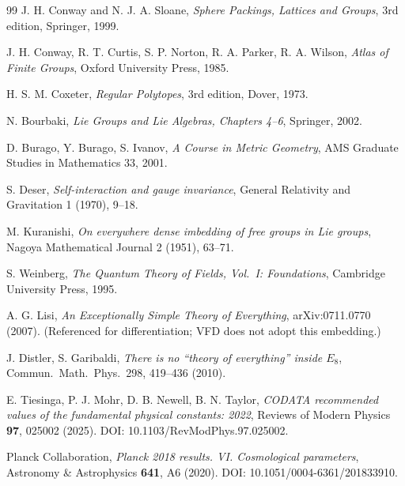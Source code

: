 \documentclass[12pt]{article}
\theoremstyle{definition}
\theoremstyle{remark}
\begin{document}
\begin{thebibliography}{99}
 J. H. Conway and N. J. A. Sloane, \emph{Sphere Packings, Lattices and Groups}, 3rd edition, Springer, 1999.

 J. H. Conway, R. T. Curtis, S. P. Norton, R. A. Parker, R. A. Wilson, \emph{Atlas of Finite Groups}, Oxford University Press, 1985.

 H. S. M. Coxeter, \emph{Regular Polytopes}, 3rd edition, Dover, 1973.

 N. Bourbaki, \emph{Lie Groups and Lie Algebras, Chapters 4--6}, Springer, 2002.

 D. Burago, Y. Burago, S. Ivanov, \emph{A Course in Metric Geometry}, AMS Graduate Studies in Mathematics 33, 2001.

 S. Deser, \emph{Self-interaction and gauge invariance}, General Relativity and Gravitation 1 (1970), 9--18.

 M. Kuranishi, \emph{On everywhere dense imbedding of free groups in Lie groups}, Nagoya Mathematical Journal 2 (1951), 63--71.

 S. Weinberg, \emph{The Quantum Theory of Fields, Vol.~I: Foundations}, Cambridge University Press, 1995.

 A. G. Lisi, \emph{An Exceptionally Simple Theory of Everything}, arXiv:0711.0770 (2007). (Referenced for differentiation; VFD does not adopt this embedding.)

 J. Distler, S. Garibaldi, \emph{There is no ``theory of everything'' inside $E_8$}, Commun.\ Math.\ Phys.\ 298, 419--436 (2010).

 E. Tiesinga, P. J. Mohr, D. B. Newell, B. N. Taylor, \emph{CODATA recommended values of the fundamental physical constants: 2022}, Reviews of Modern Physics \textbf{97}, 025002 (2025). DOI: 10.1103/RevModPhys.97.025002.

 Planck Collaboration, \emph{Planck 2018 results. VI. Cosmological parameters}, Astronomy \& Astrophysics \textbf{641}, A6 (2020). DOI: 10.1051/0004-6361/201833910.

\end{thebibliography}
\end{document}
